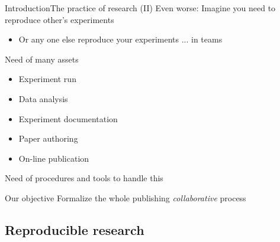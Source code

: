 \documentclass{beamer}
\begin{document}

\begin{frame}{Introduction}{The practice of research (II)}
	Even worse: Imagine you need to reproduce other's experiments
    \begin{itemize}
		\item Or any one else reproduce your experiments ... \alert{in teams}
    \end{itemize}
	
	Need of many assets
    \begin{itemize}
		\item Experiment run
		\item Data analysis
		\item Experiment documentation
		\item Paper authoring
		\item \alert{On-line publication}
    \end{itemize}

	Need of procedures and tools to handle this
	\begin{block}{Our objective}
	Formalize the whole publishing \textit{collaborative} process
	\end{block}
\end{frame}

\subsection{Reproducible research}
\end{document}
